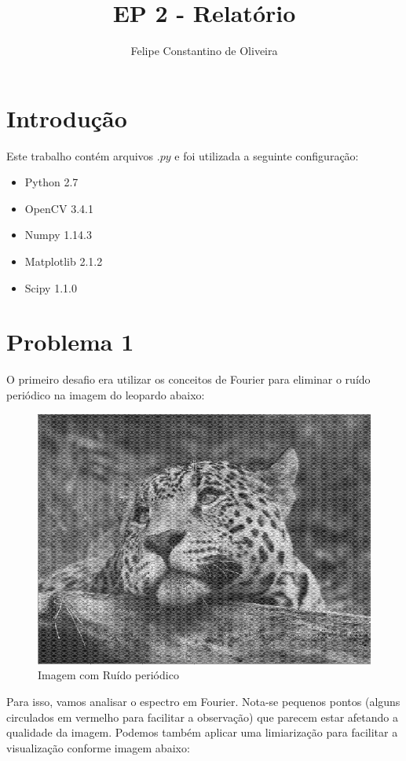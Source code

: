 \documentclass{article}
\title {\vspace{-3cm}EP 2 - Relatório}
\author{Felipe Constantino de Oliveira}
\affil{%
	MAC0417/5768 - Visão e Processamento de Imagens - IME-USP
}
\date{}
\begin{document}
	
	\maketitle

	\section{Introdução}
	
	Este trabalho contém arquivos $.py$ e foi utilizada a seguinte configuração:
	\begin{itemize}
		\item Python 2.7
		\item OpenCV 3.4.1
		\item Numpy 1.14.3
		\item Matplotlib 2.1.2
		\item Scipy 1.1.0
	\end{itemize}
	
	\section{Problema 1}

	O primeiro desafio era utilizar os conceitos de Fourier para eliminar o ruído periódico na imagem do leopardo abaixo:
	
	\begin{figure}[H]
		\centering
		\includegraphics[scale=0.3]{images/1_original.png}
		\caption{Imagem com Ruído periódico} 
	\end{figure}

	Para isso, vamos analisar o espectro em Fourier. Nota-se pequenos pontos (alguns circulados em vermelho para facilitar a observação) que parecem estar afetando a qualidade da imagem. Podemos também aplicar uma limiarização para facilitar a visualização conforme imagem abaixo:
		
\end{document}
